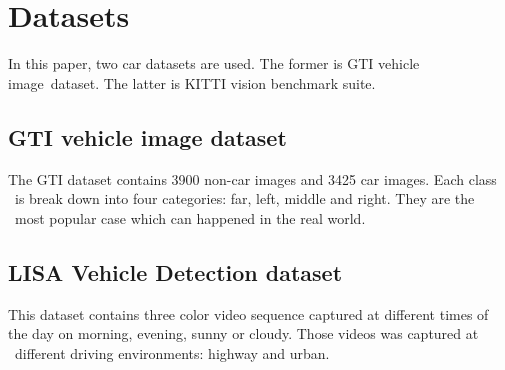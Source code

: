 \documentclass[conference]{IEEEtran}
\begin{document}
%



\section{Datasets}
In this paper, two car datasets are used. The former is GTI vehicle image\
 dataset. The latter is KITTI vision benchmark suite.

\subsection{GTI vehicle image dataset}
The GTI dataset contains 3900 non-car images and 3425  car images. Each class \
is break down into four categories: far, left, middle and right. They are the  \
most popular case which can happened in the real world.

\subsection{LISA Vehicle Detection dataset}
This dataset contains three color video sequence captured at different times of the day on morning, evening, sunny or cloudy. Those videos was captured at \
different driving environments: highway and urban.
\end{document}

